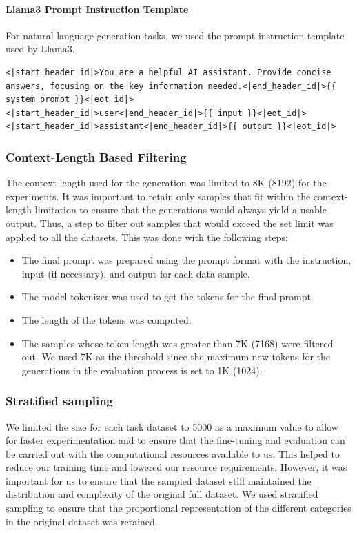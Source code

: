 \paragraph{Llama3 Prompt Instruction Template} \label{Llama3Prompt}
For natural language generation tasks, we used the prompt instruction template used by Llama3.
\begin{lstlisting}
<|start_header_id|>You are a helpful AI assistant. Provide concise 
answers, focusing on the key information needed.<|end_header_id|>{{ 
system_prompt }}<|eot_id|>
<|start_header_id|>user<|end_header_id|>{{ input }}<|eot_id|>
<|start_header_id|>assistant<|end_header_id|>{{ output }}<|eot_id|>
\end{lstlisting}

\subsubsection{Context-Length Based Filtering}
The context length used for the generation was limited to 8K (8192) for the experiments. It was important to retain only samples that fit within the context-length limitation to ensure that the generations would always yield a usable output. Thus, a step to filter out samples that would exceed the set limit was applied to all the datasets. This was done with the following steps:
\begin{itemize}
\item The final prompt was prepared using the prompt format with the instruction, input (if necessary), and output for each data sample.
\item The model tokenizer was used to get the tokens for the final prompt.
\item The length of the tokens was computed.
\item The samples whose token length was greater than 7K (7168) were filtered out. We used 7K as the threshold since the maximum new tokens for the generations in the evaluation process is set to 1K (1024).
\end{itemize}

\subsubsection{Stratified sampling}
We limited the size for each task dataset to 5000 as a maximum value to allow for faster experimentation and to ensure that the fine-tuning and evaluation can be carried out with the computational resources available to us. This helped to reduce our training time and lowered our resource requirements. However, it was important for us to ensure that the sampled dataset still maintained the distribution and complexity of the original full dataset. We used stratified sampling to ensure that the proportional representation of the different categories in the original dataset was retained.

